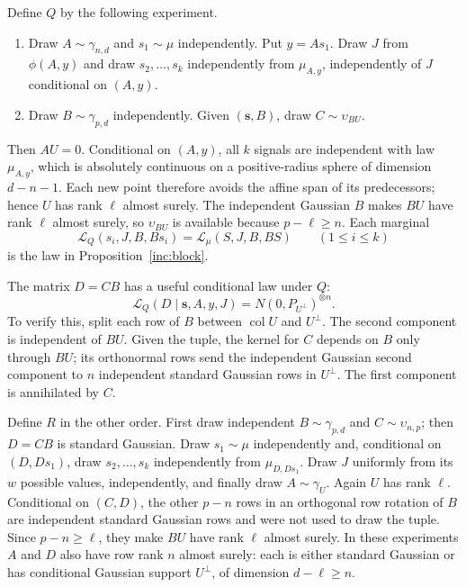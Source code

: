 Define \(Q\) by the following experiment.
\begin{enumerate}
\item Draw \(A\sim\gamma_{n,d}\) and \(s_1\sim\mu\) independently.
      Put \(y=As_1\).  Draw \(J\) from \(\phi(A,y)\) and draw
      \(s_2,\ldots,s_k\) independently from \(\mu_{A,y}\), independently
      of \(J\) conditional on \((A,y)\).
\item Draw \(B\sim\gamma_{p,d}\) independently.  Given \((\mathbf s,B)\),
      draw \(C\sim\upsilon_{BU}\).
\end{enumerate}
Then \(AU=0\).  Conditional on \((A,y)\), all \(k\) signals are
independent with law \(\mu_{A,y}\), which is absolutely continuous on
a positive-radius sphere of dimension \(d-n-1\).  Each new point
therefore avoids the affine span of its predecessors; hence \(U\) has
rank \(\ell\) almost surely.  The independent Gaussian \(B\) makes
\(BU\) have rank \(\ell\) almost surely, so \(\upsilon_{BU}\) is
available because \(p-\ell\ge n\).  Each marginal
\begin{equation}\label{inc:q-marginals}
 \mathcal L_Q(s_i,J,B,Bs_i)=\mathcal L_\mu(S,J,B,BS)
 \qquad(1\le i\le k)
\end{equation}
is the law in Proposition~\ref{inc:block}.

The matrix \(D=CB\) has a useful conditional law under \(Q\):
\begin{equation}\label{inc:conditional-D}
 \mathcal L_Q(D\mid \mathbf s,A,y,J)
 =N(0,P_{U^\perp})^{\otimes n}.
\end{equation}
To verify this, split each row of \(B\) between
\(\operatorname{col}U\) and \(U^\perp\).  The second component is
independent of \(BU\).  Given the tuple, the kernel for \(C\) depends
on \(B\) only through \(BU\); its orthonormal rows send the independent
Gaussian second component to \(n\) independent standard Gaussian rows
in \(U^\perp\).  The first component is annihilated by \(C\).

Define \(R\) in the other order.  First draw independent
\(B\sim\gamma_{p,d}\) and \(C\sim\upsilon_{n,p}\); then \(D=CB\) is
standard Gaussian.  Draw \(s_1\sim\mu\) independently and, conditional
on \((D,Ds_1)\), draw \(s_2,\ldots,s_k\) independently from
\(\mu_{D,Ds_1}\).  Draw \(J\) uniformly from its \(w\) possible values,
independently, and finally draw \(A\sim\gamma_U\).
Again \(U\) has rank \(\ell\).  Conditional on \((C,D)\), the other
\(p-n\) rows in an orthogonal row rotation of \(B\) are independent
standard Gaussian rows and were not used to draw the tuple.  Since
\(p-n\ge\ell\), they make \(BU\) have rank \(\ell\) almost surely.
In these experiments \(A\) and \(D\) also have row rank \(n\) almost
surely: each is either standard Gaussian or has conditional Gaussian
support \(U^\perp\), of dimension \(d-\ell\ge n\).

